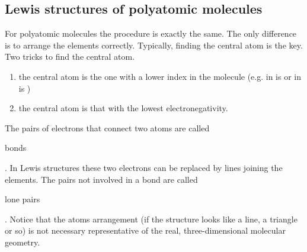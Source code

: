\documentclass[main.tex]{subfiles}
\begin{document}
\subsection*{Lewis structures of polyatomic molecules}
For polyatomic molecules the procedure is exactly the same. The only difference is to arrange the elements correctly. Typically, finding the central atom is the key. Two tricks to find the central atom.
\begin{enumerate}
\item the central atom is the one with a lower index in the molecule (e.g. in  is  or in  is )
\item the central atom is that with the lowest electronegativity.
\end{enumerate}
The pairs of electrons that connect two atoms are called \begin{it}bonds\end{it}. In Lewis structures these two electrons can be replaced by lines joining the elements. The pairs not involved in a bond are called \begin{it}lone pairs\end{it}. Notice that the atoms arrangement (if the structure looks like a line, a triangle or so) is not necessary representative of the real, three-dimensional molecular geometry.
 
\end{document}
